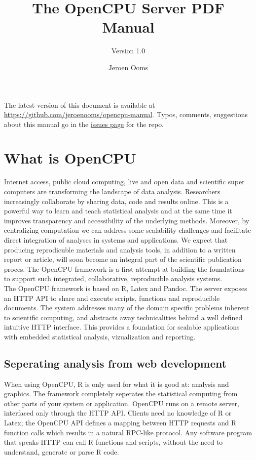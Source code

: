 \documentclass{scrartcl}\usepackage[]{graphicx}\usepackage[]{color}
\title{The OpenCPU Server PDF Manual}
\subtitle{Version 1.0}
\author{Jeroen Ooms\vspace{-1ex}}
\date{}
\begin{document}
\maketitle

\noindent The latest version of this document is available at \href{https://github.com/jeroenooms/opencpu-manual}{https://github.com/jeroenooms/opencpu-manual}. Typos, comments, suggestions about this manual go in the \href{https://github.com/jeroenooms/opencpu-manual/issues}{issues page} for the repo. 

\tableofcontents

\section{What is OpenCPU}

Internet access, public cloud computing, live and open data and scientific super computers are transforming the landscape of data analysis. Researchers increasingly collaborate by sharing data, code and results online. This is a powerful way to learn and teach statistical analysis and at the same time it improves transparency and accessibility of the underlying methods. Moreover, by centralizing computation we can address some scalability challenges and facilitate direct integration of analyses in systems and applications. We expect that producing reprodicuble materials and analysis tools, in addition to a written report or article, will soon become an integral part of the scientific publication proces. The OpenCPU framework is a first attempt at building the foundations to support such integrated, collaborative, reproducible analysis systems. \\

The OpenCPU framework is based on R, Latex and Pandoc. The server exposes an HTTP API to share and execute scripts, functions and reproducible documents. The system addresses many of the domain specific problems inherent to scientific computing, and abstracts away technicalities behind a well defined intuitive HTTP interface. This provides a foundation for scalable applications with embedded statistical analysis, vizualization and reporting.

\subsection{Seperating analysis from web development}

When using OpenCPU, R is only used for what it is good at: analysis and graphics. The framework completely seperates the statistical computing from other parts of your system or application. OpenCPU runs on a remote server, interfaced only through the HTTP API. Clients need no knowledge of R or Latex; the OpenCPU API defines a mapping between HTTP requests and R function calls which results in a natural RPC-like protocol. Any software program that speaks HTTP can call R functions and scripts, without the need to understand, generate or parse R code.
\end{document}
